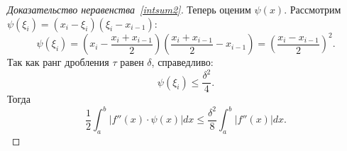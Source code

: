 \begin{proof}[Доказательство неравенства~\eqref{intsum2}]
	Теперь оценим \(\psi(x)\). Рассмотрим \(\psi(\xi_i) = (x_i - \xi_i) (\xi_i - x_{i - 1})\): \[
		\psi(\xi_i) = \left(x_i - \frac{x_i + x_{i - 1}}{2} \right) \left(\frac{x_i + x_{i - 1}}{2} - x_{i - 1}\right) = \left(\frac{x_i - x_{i - 1}}{2} \right)^2.
	\]
	Так как ранг дробления \(\tau\) равен \(\delta\), справедливо: \[
		\psi(\xi_i) \leqslant \frac{\delta^2}{4}.
	\]
	Тогда \[
		\frac{1}{2} \int_a^b \left|f''(x) \cdot \psi(x) \right| dx \leqslant \frac{\delta^2}{8} \int_a^b \left|f''(x) \right| dx.
	\]
\end{proof}

